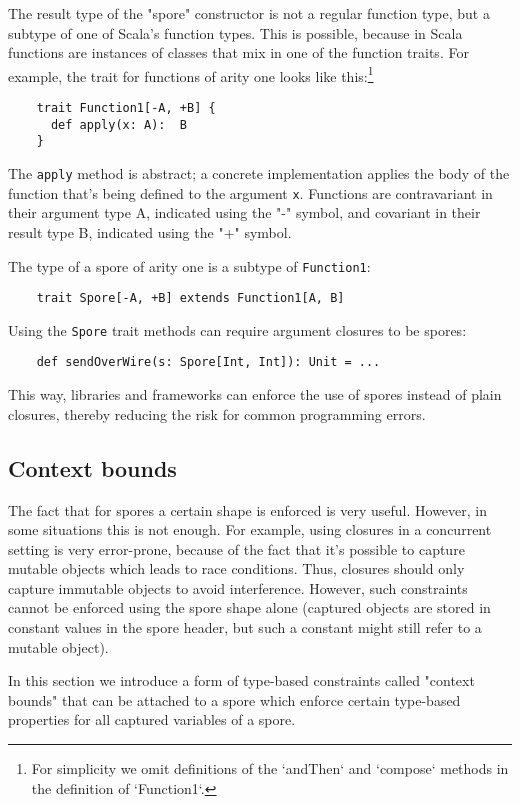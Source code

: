 The result type of the "spore" constructor is not a regular function type, but a subtype of one of Scala's function types. This is possible, because in Scala functions are instances of classes that mix in one of the function traits. For example, the trait for functions of arity one looks like this:\footnote{For simplicity we omit definitions of the `andThen` and `compose` methods in the definition of `Function1`.}

\begin{verbatim}
    trait Function1[-A, +B] {
      def apply(x: A):  B
    }
\end{verbatim}
\noindent
The \verb|apply| method is abstract; a concrete implementation applies the body of the function that's being defined to the argument \verb|x|. Functions are contravariant in their argument type A, indicated using the "-" symbol, and covariant in their result type B, indicated using the "+" symbol.

The type of a spore of arity one is a subtype of \verb|Function1|:

\begin{verbatim}
    trait Spore[-A, +B] extends Function1[A, B]
\end{verbatim}
\noindent
Using the \verb|Spore| trait methods can require argument closures to be spores:

\begin{verbatim}
    def sendOverWire(s: Spore[Int, Int]): Unit = ...
\end{verbatim}
\noindent
This way, libraries and frameworks can enforce the use of spores instead of plain closures, thereby reducing the risk for common programming errors.

\subsection{Context bounds}

The fact that for spores a certain shape is enforced is very useful. However, in some situations this is not enough. For example, using closures in a concurrent setting is very error-prone, because of the fact that it's possible to capture mutable objects which leads to race conditions. Thus, closures should only capture immutable objects to avoid interference. However, such constraints cannot be enforced using the spore shape alone (captured objects are stored in constant values in the spore header, but such a constant might still refer to a mutable object).

In this section we introduce a form of type-based constraints called "context bounds" that can be attached to a spore which enforce certain type-based properties for all captured variables of a spore.

